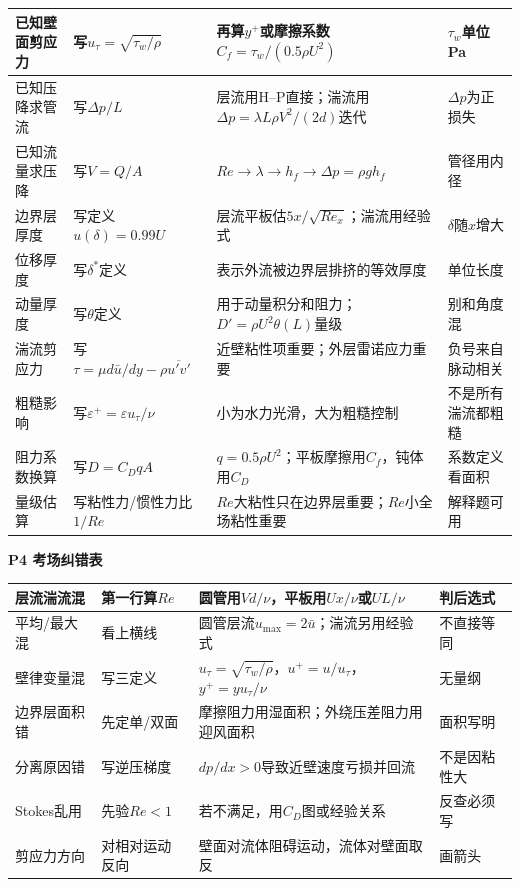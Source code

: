 \documentclass[UTF8,a4paper]{ctexart}
\newcommand{\ftitle}[1]{\vspace{1pt}\textbf{\textcolor{B}{#1}}\par\vspace{0.5pt}}
\begin{document}
\begin{tabular}{|L{0.19\textwidth}|L{0.23\textwidth}|L{0.34\textwidth}|L{0.19\textwidth}|}\hline
已知壁面剪应力 & 写$u_\tau=\sqrt{\tau_w/\rho}$ & 再算$y^+$或摩擦系数$C_f=\tau_w/(0.5\rho U^2)$ & $\tau_w$单位Pa \\\hline
已知压降求管流 & 写$\Delta p/L$ & 层流用H--P直接；湍流用$\Delta p=\lambda L\rho V^2/(2d)$迭代 & $\Delta p$为正损失 \\\hline
已知流量求压降 & 写$V=Q/A$ & $Re\to\lambda\to h_f\to\Delta p=\rho gh_f$ & 管径用内径 \\\hline
边界层厚度 & 写定义$u(\delta)=0.99U$ & 层流平板估$5x/\sqrt{Re_x}$；湍流用经验式 & $\delta$随$x$增大 \\\hline
位移厚度 & 写$\delta^*$定义 & 表示外流被边界层排挤的等效厚度 & 单位长度 \\\hline
动量厚度 & 写$\theta$定义 & 用于动量积分和阻力；$D'=\rho U^2\theta(L)$量级 & 别和角度混 \\\hline
湍流剪应力 & 写$\tau=\mu d\bar u/dy-\rho\overline{u'v'}$ & 近壁粘性项重要；外层雷诺应力重要 & 负号来自脉动相关 \\\hline
粗糙影响 & 写$\varepsilon^+=\varepsilon u_\tau/\nu$ & 小为水力光滑，大为粗糙控制 & 不是所有湍流都粗糙 \\\hline
阻力系数换算 & 写$D=C_DqA$ & $q=0.5\rho U^2$；平板摩擦用$C_f$，钝体用$C_D$ & 系数定义看面积 \\\hline
量级估算 & 写粘性力/惯性力比$1/Re$ & $Re$大粘性只在边界层重要；$Re$小全场粘性重要 & 解释题可用 \\\hline
\end{tabular}
\ftitle{P4 考场纠错表}
\begin{tabular}{|L{0.22\textwidth}|L{0.25\textwidth}|L{0.33\textwidth}|L{0.15\textwidth}|}\hline
层流湍流混 & 第一行算$Re$ & 圆管用$Vd/\nu$，平板用$Ux/\nu$或$UL/\nu$ & 判后选式 \\\hline
平均/最大混 & 看上横线 & 圆管层流$u_{\max}=2\bar u$；湍流另用经验式 & 不直接等同 \\\hline
壁律变量混 & 写三定义 & $u_\tau=\sqrt{\tau_w/\rho}$，$u^+=u/u_\tau$，$y^+=yu_\tau/\nu$ & 无量纲 \\\hline
边界层面积错 & 先定单/双面 & 摩擦阻力用湿面积；外绕压差阻力用迎风面积 & 面积写明 \\\hline
分离原因错 & 写逆压梯度 & $dp/dx>0$导致近壁速度亏损并回流 & 不是因粘性大 \\\hline
Stokes乱用 & 先验$Re<1$ & 若不满足，用$C_D$图或经验关系 & 反查必须写 \\\hline
剪应力方向 & 对相对运动反向 & 壁面对流体阻碍运动，流体对壁面取反 & 画箭头 \\\hline
\end{tabular}
\newpage
\end{document}
